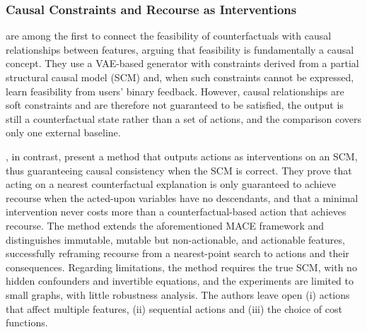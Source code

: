 \subsubsection{Causal Constraints and Recourse as Interventions}
\label{subsec:lr-causal-recourse}
\citet{mahajan2019preserving} are among the first to connect the feasibility of counterfactuals with
causal relationships between features, arguing that feasibility is fundamentally a causal concept. They
use a VAE-based generator with constraints derived from a partial structural causal model (SCM) and, when
such constraints cannot be expressed, learn feasibility from users' binary feedback. However, causal
relationships are soft constraints and are therefore not guaranteed to be satisfied, the output is still
a counterfactual state rather than a set of actions, and the comparison covers only one external baseline.

\citet{karimi2021algorithmic}, in contrast, present a method that outputs actions as interventions on an
SCM, thus guaranteeing causal consistency when the SCM is correct. They prove that acting on a nearest
counterfactual explanation is only guaranteed to achieve recourse when the acted-upon variables have no
descendants, and that a minimal intervention never costs more than a counterfactual-based action that
achieves recourse. The method extends the aforementioned MACE framework and distinguishes immutable,
mutable but non-actionable, and actionable features, successfully reframing recourse from a nearest-point
search to actions and their consequences. Regarding limitations, the method requires the true SCM, with
no hidden confounders and invertible equations, and the experiments are limited to small graphs, with
little robustness analysis. The authors leave open (i) actions that affect multiple features,
(ii) sequential actions and (iii) the choice of cost functions.

